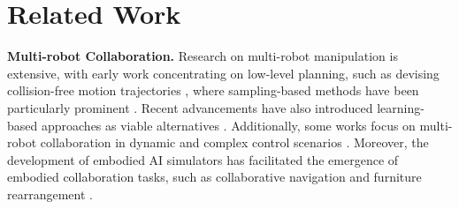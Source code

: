 \section{Related Work}
\label{sec:related}

\noindent \textbf{Multi-robot Collaboration.}
Research on multi-robot manipulation is extensive, with early work concentrating on low-level planning, such as devising collision-free motion trajectories \cite{xie2023language}, where sampling-based methods have been particularly prominent \cite{karaman2011sampling}. Recent advancements have also introduced learning-based approaches as viable alternatives \cite{zhang2022multi}. Additionally, some works focus on multi-robot collaboration in dynamic and complex control scenarios \cite{zeng2022socratic}. Moreover, the development of embodied AI simulators has facilitated the emergence of embodied collaboration tasks, such as collaborative navigation \cite{liu2022multi} and furniture rearrangement \cite{jain2020cordial}. 

